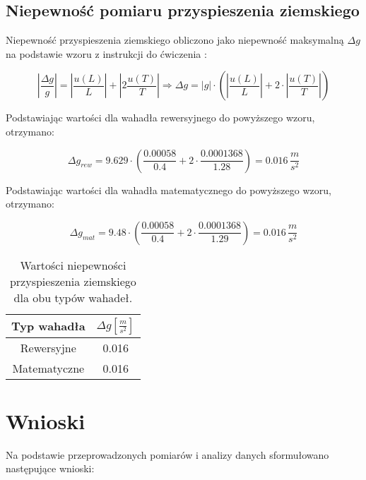 \documentclass[a4paper,12pt]{article}
\begin{document}
\subsection{Niepewność pomiaru przyspieszenia ziemskiego}

Niepewność przyspieszenia ziemskiego obliczono jako niepewność maksymalną $\Delta g$ na podstawie wzoru z instrukcji do ćwiczenia \cite{lab14manual}:

\begin{equation}
  \label{eq:niepewnosc_przyspieszenie_max}
  |\frac{\Delta g}{g}| = |\frac{u(L)}{L}| + |2 \frac{u(T)}{T}|
  \Rightarrow \Delta g = |g| \cdot (|\frac{u(L)}{L}| + 2 \cdot |\frac{u(T)}{T}|)
\end{equation}


Podstawiając wartości dla wahadła rewersyjnego do powyższego wzoru, otrzymano:

$$
  \Delta g_{rew} = 9.629 \cdot \left(\frac{0.00058}{0.4} + 2 \cdot \frac{0.0001368}{1.28}\right) = 0.016\,\frac{m}{s^2}
$$

Podstawiając wartości dla wahadła matematycznego do powyższego wzoru, otrzymano:

$$
  \Delta g_{mat} = 9.48 \cdot \left(\frac{0.00058}{0.4} + 2 \cdot \frac{0.0001368}{1.29}\right) = 0.016\,\frac{m}{s^2}
$$

\begin{table}[H]
  \centering
  \begin{tabular}{|c|c|}
    \hline
    Typ wahadła & $\Delta g \left[\frac{m}{s^2}\right]$ \\
    \hline
    Rewersyjne & 0.016 \\
    \hline
    Matematyczne & 0.016 \\
    \hline
  \end{tabular}
  \caption{Wartości niepewności przyspieszenia ziemskiego dla obu typów wahadeł.}
  \label{tab:niepewnosci}
\end{table}

\section{Wnioski}


Na podstawie przeprowadzonych pomiarów i analizy danych sformułowano następujące wnioski:
\end{document}
